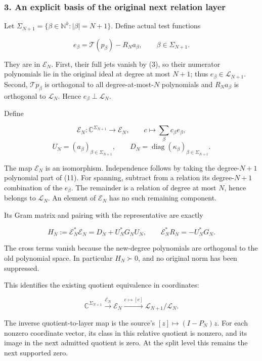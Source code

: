 \subsubsection{3. An explicit basis of the original next relation
layer}\label{kernel_layer:an-explicit-basis-of-the-original-next-relation-layer}

Let \(\Sigma_{N+1}=\{\beta\in\mathbb N^k:|\beta|=N+1\}\). Define actual
test functions

\[
\boxed{e_\beta=\mathcal T(p_\beta)-R_Na_\beta,
\qquad \beta\in\Sigma_{N+1}.}
\tag{11}
\]

They are in \(\mathcal E_N\). First, their full jets vanish by (3), so
their numerator polynomials lie in the original ideal at degree at most
\(N+1\); thus \(e_\beta\in\mathcal L_{N+1}\). Second,
\(\mathcal T p_\beta\) is orthogonal to all degree-at-most-\(N\)
polynomials and \(R_Na_\beta\) is orthogonal to \(\mathcal L_N\). Hence
\(e_\beta\perp\mathcal L_N\).

Define

\[
\mathscr E_N:\mathbb C^{\Sigma_{N+1}}\longrightarrow\mathcal E_N,
\qquad c\longmapsto\sum_\beta c_\beta e_\beta,
\tag{12}
\] \[
U_N=(a_\beta)_{\beta\in\Sigma_{N+1}},
\qquad D_N=\operatorname{diag}(\kappa_\beta)_{\beta\in\Sigma_{N+1}}.
\tag{13}
\]

The map \(\mathscr E_N\) is an isomorphism. Independence follows by
taking the degree-\(N+1\) polynomial part of (11). For spanning,
subtract from a relation its degree-\(N+1\) combination of the
\(e_\beta\). The remainder is a relation of degree at most \(N\), hence
belongs to \(\mathcal L_N\). An element of \(\mathcal E_N\) has no such
remaining component.

Its Gram matrix and pairing with the representative are exactly

\[
\boxed{H_N:=\mathscr E_N^*\mathscr E_N
=D_N+U_N^*G_NU_N,\qquad
\mathscr E_N^*R_N=-U_N^*G_N.}
\tag{14}
\]

The cross terms vanish because the new-degree polynomials are orthogonal
to the old polynomial space. In particular \(H_N\succ0\), and no
original norm has been suppressed.

This identifies the existing quotient equivalence in coordinates:

\[
\mathbb C^{\Sigma_{N+1}}\xrightarrow{\mathscr E_N}\mathcal E_N
\xrightarrow{e\mapsto[e]}\mathcal L_{N+1}/\mathcal L_N.
\tag{15}
\]

The inverse quotient-to-layer map is the source's
\([z]\mapsto(I-P_N)z\). For each nonzero coordinate vector, its class in
this relative quotient is nonzero, and its image in the next admitted
quotient is zero. At the split level this remains the next supported
zero.


